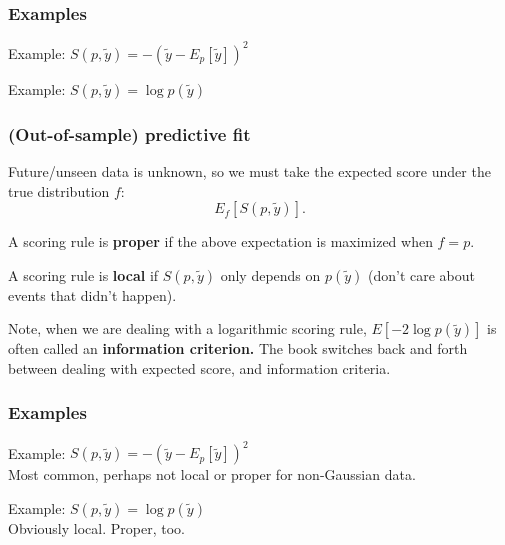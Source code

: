 \documentclass{beamer}
\begin{document}
\begin{frame}
\frametitle{Examples}


Example: $S(p,\tilde{y}) = -(\tilde{y} - E_p[\tilde{y}])^2$
\newline


Example: $S(p,\tilde{y}) = \log p(\tilde{y})$
\newline


\end{frame}

\begin{frame}
\frametitle{(Out-of-sample) predictive fit}

Future/unseen data is unknown, so we must take the expected score under the true distribution $f$:
$$
E_f[S(p,\tilde{y})].
$$

A scoring rule is {\bf proper} if the above expectation is maximized when $f = p$.
\newline

A scoring rule is {\bf local} if $S(p,\tilde{y})$ only depends on $p(\tilde{y})$ (don't care about events that didn't happen).
\newline

Note, when we are dealing with a logarithmic scoring rule, $E[-2\log p(\tilde{y})]$ is often called an {\bf information criterion.} The book switches back and forth between dealing with expected score, and information criteria. 

\end{frame}

\begin{frame}
\frametitle{Examples}


Example: $S(p,\tilde{y}) = -(\tilde{y} - E_p[\tilde{y}])^2$ \\
Most common, perhaps not local or proper for non-Gaussian data.
\newline

Example: $S(p,\tilde{y}) = \log p(\tilde{y})$\\
Obviously local. Proper, too.


\end{frame}
\end{document}
